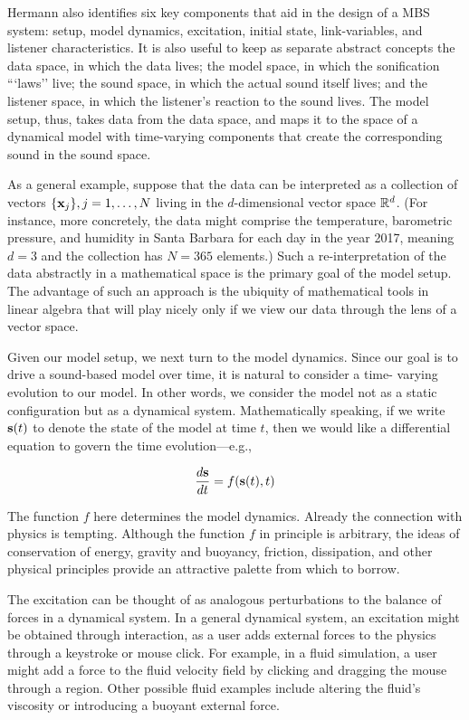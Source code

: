 Hermann also identifies six key components that aid in the design of a MBS 
system: setup, model dynamics, excitation, initial state, link-variables, and 
listener characteristics. It is also useful to keep as separate abstract 
concepts the data space, in which the data lives; the model space, in which 
the sonification ```laws'' live; the sound space, in which the actual sound 
itself lives; and the listener space, in which the listener's reaction to the 
sound lives. The model setup, thus, takes data from the data space, and maps 
it to the space of a dynamical model with time-varying components that create 
the corresponding sound in the sound space. 

As a general example, suppose that the data can be interpreted as a 
collection of vectors $\{\mathbf{x}_j\}, j=1,\dots,N$ living in the $d$-dimensional 
vector space $\mathbb{R}^d$. (For instance, more concretely, the data might comprise 
the temperature, barometric pressure, and humidity in Santa Barbara for each 
day in the year 2017, meaning $d=3$ and the collection has $N=365$ elements.) 
Such a re-interpretation of the data abstractly in a mathematical space is 
the primary goal of the model setup. The advantage of such an approach is the 
ubiquity of mathematical tools in linear algebra that will play nicely only 
if we view our data through the lens of a vector space.

Given our model setup, we next turn to the model dynamics. Since our goal is 
to drive a sound-based model over time, it is natural to consider a time-
varying evolution to our model. In other words, we consider the model not as 
a static configuration but as a dynamical system. Mathematically speaking, if 
we write ${\mathbf{s}}(t)$ to denote the state of the model at time $t$, then we 
would like a differential equation to govern the time evolution---e.g.,

\begin{equation}
\frac{d{\mathbf{s}}}{dt} = f({\mathbf{s}}(t), t)
\end{equation}

The function $f$ here determines the model dynamics. Already the connection 
with physics is tempting. Although the function $f$ in principle is 
arbitrary, the ideas of conservation of energy, gravity and buoyancy, 
friction, dissipation, and other physical principles provide an attractive 
palette from which to borrow. 

The excitation can be thought of as analogous perturbations to the balance of 
forces in a dynamical system. In a general dynamical system, an excitation 
might be obtained through interaction, as a user adds external forces to the 
physics through a keystroke or mouse click. For example, in a fluid 
simulation, a user might add a force to the fluid velocity field by clicking 
and dragging the mouse through a region. Other possible fluid examples 
include altering the fluid's viscosity or introducing a buoyant external 
force. 

